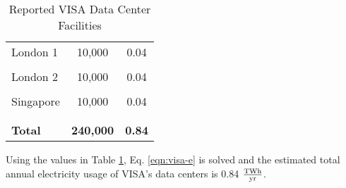 \begin{table}
{\begin{tabular}[ht]{l c c}
      London 1                            & 10,000                            & 0.04                                          \\
                                          &                                   &                                               \\ 
      London 2                            & 10,000                            & 0.04                                          \\
                                          &                                   &                                               \\ 
      Singapore                           & 10,000                            & 0.04                                          \\
                                          &                         					&                           					          \\ 
      \hline 
                                          &                         					&                           					          \\ 
      \textbf{Total}                      & \textbf{240,000}                  & \textbf{0.84}                                 \\
    \end{tabular}
  }
  \endgroup
  \caption{Reported VISA Data Center Facilities \cite{visa-oce-occ, visa-london-singapore} }
  \label{table:visa-dc}
\end{table}

Using the values in Table \ref{table:visa-dc}, Eq. \eqref{eqn:visa-e} is solved and the estimated total annual electricity usage of VISA's data centers is 0.84 $\tfrac{ \textrm{{T}Wh} } { \textrm{yr} }$.
\newpage
